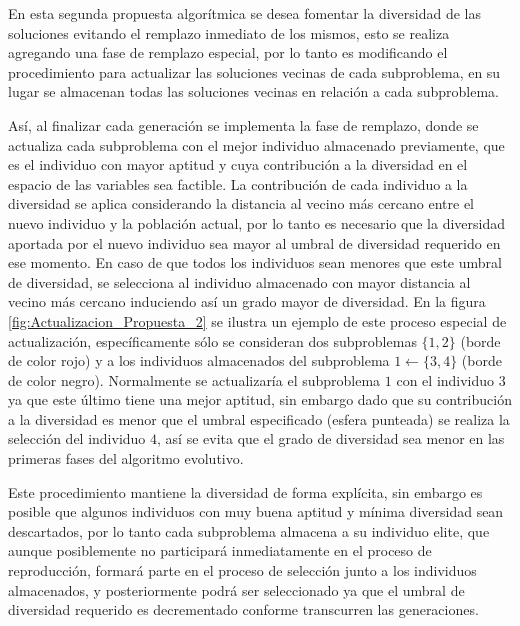 En esta segunda propuesta algorítmica se desea fomentar la diversidad de las soluciones evitando el remplazo inmediato de los mismos, esto se realiza agregando una fase de remplazo especial, por lo tanto es modificando el procedimiento para actualizar las soluciones vecinas de cada subproblema, en su lugar se almacenan todas las soluciones vecinas en relación a cada subproblema.
%

Así, al finalizar cada generación se implementa la fase de remplazo, donde se actualiza cada subproblema con el mejor individuo almacenado previamente, que es el individuo con mayor aptitud y cuya contribución a la diversidad en el espacio de las variables sea factible.
%
La contribución de cada individuo a la diversidad se aplica considerando la distancia al vecino más cercano entre el nuevo individuo y la población actual, por lo tanto es necesario que la diversidad aportada por el nuevo individuo sea mayor al umbral de diversidad requerido en ese momento.
%
En caso de que todos los individuos sean menores que este umbral de diversidad, se selecciona al individuo almacenado con mayor distancia al vecino más cercano induciendo así un grado mayor de diversidad.
%
En la figura \ref{fig:Actualizacion_Propuesta_2} se ilustra un ejemplo de este proceso especial de actualización, específicamente sólo se consideran dos subproblemas $\{1, 2\}$ (borde de color rojo) y a los individuos almacenados del subproblema $1 \leftarrow \{3, 4 \}$ (borde de color negro).
%
Normalmente se actualizaría el subproblema $1$ con el individuo $3$ ya que este último tiene una mejor aptitud, sin embargo dado que su contribución a la diversidad es menor que el umbral especificado (esfera punteada) se realiza la selección del individuo $4$, así se evita que el grado de diversidad sea menor en las primeras fases del algoritmo evolutivo.
%

Este procedimiento mantiene la diversidad de forma explícita, sin embargo es posible que algunos individuos con muy buena aptitud y mínima diversidad sean descartados, por lo tanto cada subproblema almacena a su individuo elite, que aunque posiblemente no participará inmediatamente en el proceso de reproducción, formará parte en el proceso de selección junto a los individuos almacenados, y posteriormente podrá ser seleccionado ya que el umbral de diversidad requerido es decrementado conforme transcurren las generaciones.

